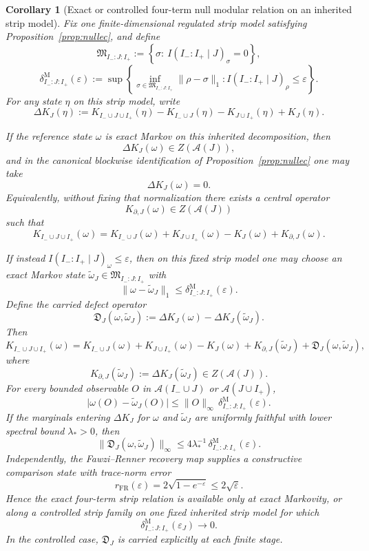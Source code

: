 \documentclass[11pt]{article}
\newtheorem{corollary}[theorem]{Corollary}
\begin{document}
\begin{corollary}[Exact or controlled four-term null modular relation on an inherited strip model]\label{cor:n1}
Fix one finite-dimensional regulated strip model satisfying Proposition~\ref{prop:nullec}, and define
\[
\mathfrak M_{I_-:J:I_+}
:=
\left\{
\sigma:\ I(I_-:I_+\mid J)_\sigma=0
\right\},
\]
\[
\delta^{\mathrm M}_{I_-:J:I_+}(\varepsilon)
:=
\sup\left\{
\inf_{\sigma\in\mathfrak M_{I_-:J:I_+}}\|\rho-\sigma\|_1:
I(I_-:I_+\mid J)_\rho\le \varepsilon
\right\}.
\]
For any state \(\eta\) on this strip model, write
\[
\Delta K_J(\eta)
:=
K_{I_-\cup J\cup I_+}(\eta)-K_{I_-\cup J}(\eta)-K_{J\cup I_+}(\eta)+K_J(\eta).
\]

If the reference state \(\omega\) is exact Markov on this inherited decomposition, then
\[
\Delta K_J(\omega)\in Z(\mathcal A(J)),
\]
and in the canonical blockwise identification of Proposition~\ref{prop:nullec} one may take
\[
\Delta K_J(\omega)=0.
\]
Equivalently, without fixing that normalization there exists a central operator
\[
K_{\partial,J}(\omega)\in Z(\mathcal A(J))
\]
such that
\[
K_{I_-\cup J\cup I_+}(\omega)
=
K_{I_-\cup J}(\omega)+K_{J\cup I_+}(\omega)-K_J(\omega)+K_{\partial,J}(\omega).
\]

If instead \(I(I_-:I_+\mid J)_\omega\le \varepsilon\), then on this fixed strip model one may choose an exact Markov state \(\widetilde\omega_J\in \mathfrak M_{I_-:J:I_+}\) with
\[
\|\omega-\widetilde\omega_J\|_1
\le
\delta^{\mathrm M}_{I_-:J:I_+}(\varepsilon).
\]
Define the carried defect operator
\[
\mathfrak D_J(\omega,\widetilde\omega_J)
:=
\Delta K_J(\omega)-\Delta K_J(\widetilde\omega_J).
\]
Then
\[
K_{I_-\cup J\cup I_+}(\omega)
=
K_{I_-\cup J}(\omega)+K_{J\cup I_+}(\omega)-K_J(\omega)
+K_{\partial,J}(\widetilde\omega_J)
+\mathfrak D_J(\omega,\widetilde\omega_J),
\]
where
\[
K_{\partial,J}(\widetilde\omega_J):=\Delta K_J(\widetilde\omega_J)\in Z(\mathcal A(J)).
\]
For every bounded observable \(O\) in \(\mathcal A(I_-\cup J)\) or \(\mathcal A(J\cup I_+)\),
\[
\bigl|\omega(O)-\widetilde\omega_J(O)\bigr|
\le
\|O\|_\infty\,
\delta^{\mathrm M}_{I_-:J:I_+}(\varepsilon).
\]
If the marginals entering \(\Delta K_J\) for \(\omega\) and \(\widetilde\omega_J\) are uniformly faithful with lower spectral bound \(\lambda_\ast>0\), then
\[
\|\mathfrak D_J(\omega,\widetilde\omega_J)\|_\infty
\le
4\lambda_\ast^{-1}\,
\delta^{\mathrm M}_{I_-:J:I_+}(\varepsilon).
\]
Independently, the Fawzi--Renner recovery map supplies a constructive comparison state with trace-norm error
\[
r_{\mathrm{FR}}(\varepsilon)
=
2\sqrt{1-e^{-\varepsilon}}
\le
2\sqrt{\varepsilon}.
\]
Hence the exact four-term strip relation is available only at exact Markovity, or along a controlled strip family on one fixed inherited strip model for which
\[
\delta^{\mathrm M}_{I_-:J:I_+}(\varepsilon_J)\to 0.
\]
In the controlled case, \(\mathfrak D_J\) is carried explicitly at each finite stage.
\end{corollary}
\end{document}
